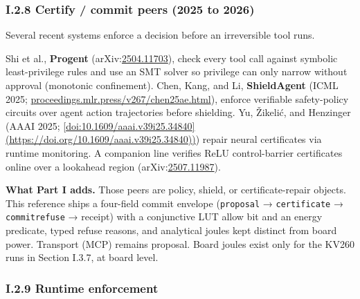 \documentclass[
  10pt,
]{article}
\begin{document}
\subsubsection{I.2.8 Certify / commit peers (2025 to
2026)}\label{i.2.8-certify-commit-peers-2025-to-2026}

Several recent systems enforce a decision before an irreversible tool
runs.

Shi et al., \textbf{Progent}
(arXiv:\href{https://arxiv.org/abs/2504.11703}{2504.11703}), check every
tool call against symbolic least-privilege rules and use an SMT solver
so privilege can only narrow without approval (monotonic confinement).
Chen, Kang, and Li, \textbf{ShieldAgent} (ICML 2025;
\href{https://proceedings.mlr.press/v267/chen25ae.html}{proceedings.mlr.press/v267/chen25ae.html}),
enforce verifiable safety-policy circuits over agent action trajectories
before shielding. Yu, Žikelić, and Henzinger (AAAI 2025;
\href{https://doi.org/10.1609/aaai.v39i25.34840\%5D(https://doi.org/10.1609/aaai.v39i25.34840)}{{[}doi:10.1609/aaai.v39i25.34840{]}(https://doi.org/10.1609/aaai.v39i25.34840))})
repair neural certificates via runtime monitoring. A companion line
verifies ReLU control-barrier certificates online over a lookahead
region (arXiv:\href{https://arxiv.org/abs/2507.11987}{2507.11987}).

\textbf{What Part I adds.} Those peers are policy, shield, or
certificate-repair objects. This reference ships a four-field commit
envelope (\texttt{proposal} → \texttt{certificate} →
\texttt{commit\textbar{}refuse} → receipt) with a conjunctive LUT allow
bit and an energy predicate, typed refuse reasons, and analytical joules
kept distinct from board power. Transport (MCP) remains proposal. Board
joules exist only for the KV260 runs in Section I.3.7, at board level.

\subsubsection{I.2.9 Runtime
enforcement}\label{i.2.9-runtime-enforcement}
\end{document}
